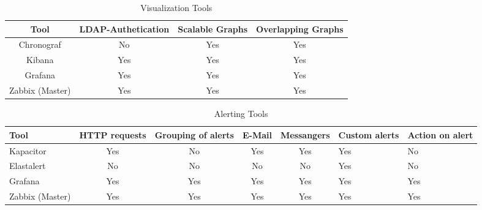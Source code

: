 \begin{table}[]
\centering
\caption{Visualization Tools}
\label{my-label}
\begin{tabular}{cccc}
	\hline
Tool & LDAP-Authetication         & Scalable Graphs             & Overlapping Graphs          \\
\hline
Chronograf                   & No & Yes                         & Yes                         \\
Kibana                       & Yes                        & Yes & Yes                         \\
Grafana                      & Yes                        & Yes & Yes                         \\
Zabbix (Master)              & Yes                        & Yes                         & Yes\\
\hline
\end{tabular}
\end{table}

\begin{table}[]
	\centering
	\caption{Alerting Tools}
	\label{my-label}
	\begin{tabular}{lcccc}
		\hline
		Tool & HTTP requests & Grouping of alerts         & E-Mail                      & Messangers                  & Custom alerts & Action on alert \\
		\hline
		Kapacitor                    & Yes           & No & Yes                         & Yes                         & Yes           & No              \\
		Elastalert                   & No            & No                         & No  & No                          & Yes           & No              \\
		Grafana                      & Yes           & Yes                        & Yes & Yes                         & Yes           & Yes             \\
		Zabbix (Master)              & Yes           & Yes                        & Yes                         & Yes & Yes           & Yes            \\
		\hline
	\end{tabular}
\end{table}

